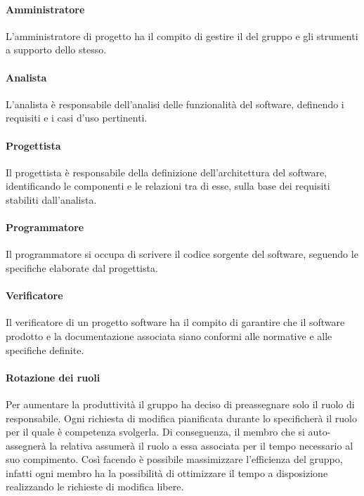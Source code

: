 \paragraph{Amministratore}
L'amministratore di progetto ha il compito di gestire il  del gruppo e gli strumenti a supporto dello stesso.

\paragraph{Analista}
L'analista è responsabile dell’analisi delle funzionalità del software, definendo i requisiti e i casi d’uso pertinenti.

\paragraph{Progettista}
Il progettista è responsabile della definizione dell’architettura del software, identificando le componenti e le relazioni tra di esse, sulla base dei requisiti stabiliti dall’analista. 

\paragraph{Programmatore}
Il programmatore si occupa di scrivere il codice sorgente del software, seguendo le specifiche elaborate dal progettista.

\paragraph{Verificatore}
Il verificatore di un progetto software ha il compito di garantire che il software prodotto e la documentazione associata siano conformi alle normative e alle specifiche definite. 

\paragraph{Rotazione dei ruoli}
Per aumentare la produttività il gruppo ha deciso di preassegnare solo il ruolo di responsabile.
Ogni richiesta di modifica pianificata durante lo  specificherà il ruolo per il quale è competenza svolgerla.
Di conseguenza, il membro che si auto-assegnerà la relativa  assumerà il ruolo a essa associata per il tempo necessario al suo compimento.
Così facendo è possibile massimizzare l'efficienza del gruppo, infatti ogni membro ha la possibilità di ottimizzare il tempo a disposizione realizzando le richieste di modifica libere.


